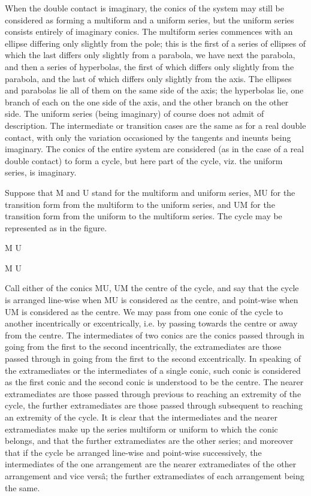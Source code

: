 \documentclass[11pt,a4paper]{article}
\theoremstyle{plain}
\begin{document}
When the double contact is imaginary, the conics of the system may still be considered as forming a multiform and a uniform series, but the uniform series consists entirely of imaginary conics. The multiform series commences with an ellipse differing only slightly from the pole; this is the first of a series of ellipses of which the last differs only slightly from a parabola, we have next the parabola, and then a series of hyperbolas, the first of which differs only slightly from the parabola, and the last of which differs only slightly from the axis. The ellipses and parabolas lie all of them on the same side of the axis; the hyperbolas lie, one branch of each on the one side of the axis, and the other branch on the other side. The uniform series (being imaginary) of course does not admit of description. The intermediate or transition cases are the same as for a real double contact, with only the variation occasioned by the tangents and ineunts being imaginary. The conics of the entire system are considered (as in the case of a real double contact) to form a cycle, but here part of the cycle, viz. the uniform series, is imaginary.

Suppose that M and U stand for the multiform and uniform series, MU for the transition form from the multiform to the uniform series, and UM for the transition form from the uniform to the multiform series. The cycle may be represented as in the figure.

\hfill M U

\hfill M \hspace{2cm} U

Call either of the conics MU, UM the centre of the cycle, and say that the cycle is arranged line-wise when MU is considered as the centre, and point-wise when UM is considered as the centre. We may pass from one conic of the cycle to another incentrically or excentrically, i.e. by passing towards the centre or away from the centre. The intermediates of two conics are the conics passed through in going from the first to the second incentrically, the extramediates are those passed through in going from the first to the second excentrically. In speaking of the extramediates or the intermediates of a single conic, such conic is considered as the first conic and the second conic is understood to be the centre. The nearer extramediates are those passed through previous to reaching an extremity of the cycle, the further extramediates are those passed through subsequent to reaching an extremity of the cycle. It is clear that the intermediates and the nearer extramediates make up the series multiform or uniform to which the conic belongs, and that the further extramediates are the other series; and moreover that if the cycle be arranged line-wise and point-wise successively, the intermediates of the one arrangement are the nearer extramediates of the other arrangement and vice vers\^{a}; the further extramediates of each arrangement being the same.
\end{document}
